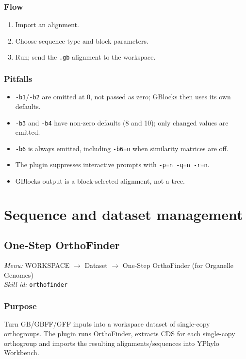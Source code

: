 \documentclass[11pt]{report}
\begin{document}
\subsection{Flow}

\begin{enumerate}
  \item Import an alignment.
  \item Choose sequence type and block parameters.
  \item Run; send the \texttt{.\allowbreak gb} alignment to the workspace.
\end{enumerate}

\subsection{Pitfalls}

\begin{itemize}
  \item \texttt{-b1}/\texttt{-b2} are omitted at 0, not passed as zero; GBlocks then uses its own defaults.
  \item \texttt{-b3} and \texttt{-b4} have non-zero defaults (8 and 10); only changed values are emitted.
  \item \texttt{-b6} is always emitted, including \texttt{-b6=n} when similarity matrices are off.
  \item The plugin suppresses interactive prompts with \texttt{-p=n -q=n -r=n}.
  \item GBlocks output is a block-selected alignment, not a tree.
\end{itemize}


\chapter{Sequence and dataset management}
\section{One-Step OrthoFinder}
\noindent\textit{Menu:} WORKSPACE $\rightarrow$ Dataset $\rightarrow$ One-Step OrthoFinder (for Organelle Genomes)\\
\noindent\textit{Skill id:} \texttt{orthofinder}

\subsection{Purpose}

Turn GB/GBFF/GFF inputs into a workspace dataset of single-copy orthogroups. The plugin runs OrthoFinder, extracts CDS for each single-copy orthogroup and imports the resulting alignments/sequences into YPhylo Workbench.
\end{document}
